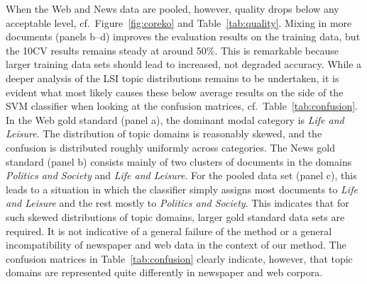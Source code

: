 \documentclass[11pt]{article}
\begin{document}
When the Web and News data are pooled, however, quality drops below any acceptable level, cf.\ Figure~\ref{fig:coreko} and Table~\ref{tab:quality}.
Mixing in more documents (panels b--d) improves the evaluation results on the training data, but the 10CV results remains steady at around 50\%.
This is remarkable because larger training data sets should lead to increased, not degraded accuracy.
While a deeper analysis of the LSI topic distributions remains to be undertaken, it is evident what most likely causes these below average results on the side of the SVM classifier when looking at the confusion matrices, cf.\ Table~\ref{tab:confusion}.
In the Web gold standard (panel a), the dominant modal category is \textit{Life and Leisure}.
The distribution of topic domains is reasonably skewed, and the confusion is distributed roughly uniformly across categories.
The News gold standard (panel b) consists mainly of two clusters of documents in the domains \textit{Politics and Society} and \textit{Life and Leisure}.
For the pooled data set (panel c), this leads to a situation in which the classifier simply assigns most documents to \textit{Life and Leisure} and the rest mostly to \textit{Politics and Society}.
This indicates that for such skewed distributions of topic domains, larger gold standard data sets are required.
It is not indicative of a general failure of the method or a general incompatibility of newspaper and web data in the context of our method.
The confusion matrices in Table~\ref{tab:confusion} clearly indicate, however, that topic domains are represented quite differently in newspaper and web corpora.
\end{document}
